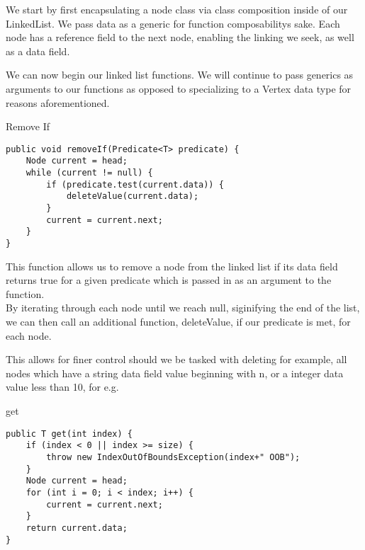 \documentclass[a4paper]{article}
\begin{document}
We start by first encapsulating a node 
class via class composition inside of our LinkedList. We pass data as
a generic for function composabilitys sake. Each node has a reference field 
to the next node, enabling the linking we seek, as well as a data field.

\newpage

We can now begin our linked list functions. We will continue to pass
generics as arguments to our functions as opposed to specializing to a Vertex data type
for reasons aforementioned. \\

\makeatletter
\renewcommand{\ALG@name}{Function}
\makeatother
\setcounter{algorithm}{0}

\begin{algorithm}
\caption{Remove If}\label{euclid}

\begin{verbatim}
public void removeIf(Predicate<T> predicate) {
    Node current = head;
    while (current != null) {
        if (predicate.test(current.data)) {
            deleteValue(current.data);
        }
        current = current.next;
    }
}
\end{verbatim}
\end{algorithm}

This function allows us to remove a node from the linked list 
if its data field returns true for a given predicate
which is passed in as an argument to the function. \\

By iterating through each node until we reach null, siginifying
the end of the list, we can then call an additional 
function, deleteValue, if our predicate is met, for each node.

This allows for finer control should we be tasked with deleting 
for example, all nodes which have a string data field value 
beginning with n, or a integer data value less than 10, for e.g.




\begin{algorithm}
\caption{get}\label{euclid}

\begin{verbatim}
public T get(int index) {
    if (index < 0 || index >= size) {
        throw new IndexOutOfBoundsException(index+" OOB");
    }
    Node current = head;
    for (int i = 0; i < index; i++) {
        current = current.next;
    }
    return current.data;
}
\end{verbatim}

\end{algorithm}
\end{document}
